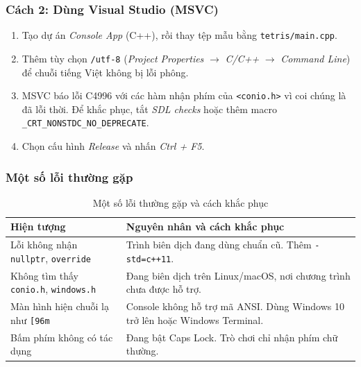 \subsubsection{Cách 2: Dùng Visual Studio (MSVC)}

\begin{enumerate}
    \item Tạo dự án \textit{Console App} (C++), rồi thay tệp mẫu bằng \texttt{tetris/main.cpp}.
    \item Thêm tùy chọn \texttt{/utf-8} (\textit{Project Properties} $\rightarrow$ \textit{C/C++} $\rightarrow$ \textit{Command Line}) để chuỗi tiếng Việt không bị lỗi phông.
    \item MSVC báo lỗi C4996 với các hàm nhận phím của \texttt{<conio.h>} vì coi chúng là đã lỗi thời. Để khắc phục, tắt \textit{SDL checks} hoặc thêm macro \texttt{\_CRT\_NONSTDC\_NO\_DEPRECATE}.
    \item Chọn cấu hình \textit{Release} và nhấn \textit{Ctrl + F5}.
\end{enumerate}

\subsubsection{Một số lỗi thường gặp}

\begin{table}[H]
    \centering
    \caption{Một số lỗi thường gặp và cách khắc phục}
    \label{tab:loi_thuong_gap}
    \renewcommand{\arraystretch}{1.3}
    \begin{tabularx}{\textwidth}{|p{5.4cm}|X|}
        \hline
        \textbf{Hiện tượng} & \textbf{Nguyên nhân và cách khắc phục} \\
        \hline
        Lỗi không nhận \texttt{nullptr}, \texttt{override} & Trình biên dịch đang dùng chuẩn cũ. Thêm \texttt{-std=c++11}. \\
        \hline
        Không tìm thấy \texttt{conio.h}, \texttt{windows.h} & Đang biên dịch trên Linux/macOS, nơi chương trình chưa được hỗ trợ. \\
        \hline
        Màn hình hiện chuỗi lạ như \texttt{[96m} & Console không hỗ trợ mã ANSI. Dùng Windows 10 trở lên hoặc Windows Terminal. \\
        \hline
        Bấm phím không có tác dụng & Đang bật Caps Lock. Trò chơi chỉ nhận phím chữ thường. \\
        \hline
    \end{tabularx}
\end{table}

